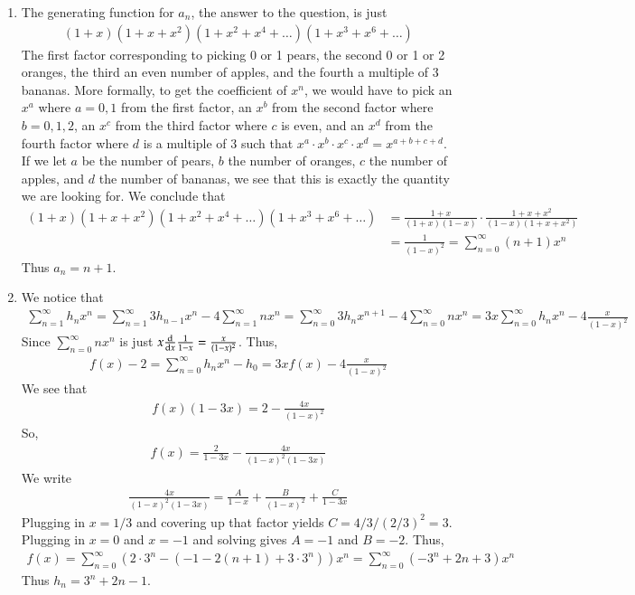 \documentclass[12pt]{article}
\theoremstyle{definitionstyle}
\begin{document}
\begin{enumerate}[leftmargin=\labelsep]
		\item The generating function for $a_n$, the answer to the question, is just
		\begin{align*}
			(1+x)(1+x+x^2)(1+x^2+x^4+\ldots)(1+x^3+x^6+\ldots)
		\end{align*}
		The first factor corresponding to picking 0 or 1 pears, the second 0 or 1 or 2 oranges, the third an even number of apples, and the fourth a multiple of 3 bananas. More formally, to get the coefficient of $x^n$, we would have to pick an $x^a$ where $a = 0, 1$ from the first factor, an $x^b$ from the second factor where $b = 0, 1, 2$, an $x^c$ from the third factor where $c$ is even, and an $x^d$ from the fourth factor where $d$ is a multiple of 3 such that $x^a \cdot x^b \cdot x^c \cdot x^d = x^{a+b+c+d}$. If we let $a$ be the number of pears, $b$ the number of oranges, $c$ the number of apples, and $d$ the number of bananas, we see that this is exactly the quantity we are looking for. We conclude that
		\begin{align*}
			(1+x)(1+x+x^2)(1+x^2+x^4+\ldots)(1+x^3+x^6+\ldots) &= \frac{1+x}{(1+x)(1-x)} \cdot \frac{1+x+x^2}{(1-x)(1+x+x^2)} \\
			&= \frac{1}{(1-x)^2} = \sum_{n=0}^\infty (n+1)x^n
		\end{align*}
		Thus $a_n = n+1$.
		
	
		\item We notice that
		\begin{align*}
			\sum_{n=1}^\infty h_nx^n = \sum_{n=1}^\infty 3h_{n-1}x^n -4 \sum_{n=1}^\infty nx^n = \sum_{n=0}^\infty 3h_{n}x^{n+1} -4 \sum_{n=0}^\infty nx^n = 3x\sum_{n=0}^\infty h_{n}x^{n} - 4\frac{x}{(1-x)^2}
		\end{align*}
		Since $\sum_{n=0}^\infty nx^n$ is just $x \dv{x} \frac{1}{1-x} = \frac{x}{(1-x)^2}$. Thus,
		\begin{align*}
			f(x) - 2 = \sum_{n=0}^\infty h_nx^n - h_0 = 3xf(x) - 4\frac{x}{(1-x)^2}
		\end{align*}
		We see that
		\begin{align*}
			f(x)(1-3x) = 2 - \frac{4x}{(1-x)^2}
		\end{align*}
		So,
		\begin{align*}
			f(x) = \frac{2}{1-3x} - \frac{4x}{(1-x)^2(1-3x)}
		\end{align*}
		We write
		\begin{align*}
			\frac{4x}{(1-x)^2(1-3x)} = \frac{A}{1-x} + \frac{B}{(1-x)^2} + \frac{C}{1-3x}
		\end{align*}
		Plugging in $x = 1/3$ and covering up that factor yields $C = 4/3 / (2/3)^2 = 3$. Plugging in $x = 0$ and $x = -1$ and solving gives $A = -1$ and $B = -2$. Thus,
		\begin{align*}
			f(x) = \sum_{n=0}^\infty (2 \cdot 3^n - (-1 - 2(n+1) + 3 \cdot 3^n))x^n = \sum_{n=0}^\infty (-3^n + 2n + 3)x^n
		\end{align*}
		Thus $h_n = 3^n + 2n - 1$.
		

\end{enumerate}
\end{document}
